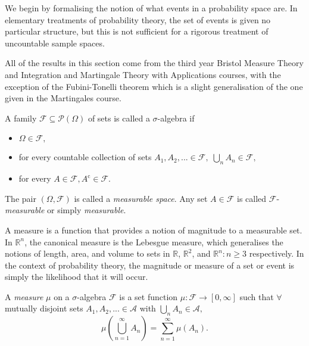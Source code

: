 We begin by formalising the notion of what events in a probability space are.
In elementary treatments of probability theory, the set of events is given no particular 
structure, but this is not sufficient for a rigorous treatment of uncountable sample 
spaces. 

All of the results in this section come from the third year Bristol Measure Theory and Integration
and Martingale Theory with Applications courses, with the exception of the Fubini-Tonelli
theorem which is a slight generalisation of the one given in the Martingales course.

\begin{definition}
    A family $\mathcal{F}\subseteq\mathcal{P}(\Omega)$ of sets is called a $\sigma$-algebra if 
    \begin{itemize}
        \item $\Omega\in\mathcal{F},$
        \item for every countable collection of sets $A_1,A_2,...\in\mathcal{F},\;\bigcup_{n}A_n\in\mathcal{F},$
        \item for every $A\in\mathcal{F}, A^{\mathrm c}\in\mathcal{F}.$
    \end{itemize}
\end{definition}

\begin{remark}
    The pair $(\Omega,\mathcal{F})$ is called a \emph{measurable space}. Any set $A\in\mathcal{F}$
    is called $\mathcal{F}$-\emph{measurable} or simply \emph{measurable}.
\end{remark}

A measure is a function that provides a notion of magnitude to a measurable set. 
In $\mathbb{R}^n$, the canonical measure is the Lebesgue measure, which generalises the 
notions of length, area, and volume to sets in $\mathbb{R}$, $\mathbb{R}^2$, and $\mathbb{R}^n:n\geq3$
respectively.
In the context of probability theory, the magnitude or measure of a set or event is 
simply the likelihood that it will occur.

\begin{definition}[Measure]
    A \emph{measure} $\mu$ on a $\sigma$-algebra $\mathcal{F}$ is a set function
    $\mu:\mathcal{F}\rightarrow[0,\infty]$ such that $\forall$ mutually disjoint
    sets $A_1,A_2,...\in\mathcal{A}$ with $\bigcup_nA_n\in\mathcal{A},$
    \begin{equation*}
        \mu\left(\bigcup_{n=1}^{\infty}A_n\right)=\sum_{n=1}^{\infty}\mu(A_n).
    \end{equation*}
\end{definition}

